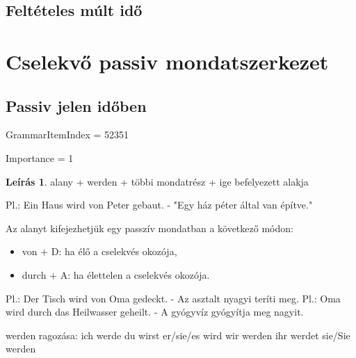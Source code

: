 \documentclass{article}
\theoremstyle{definition}
\newtheorem*{desc}{Leírás}
\begin{document}
\subsection{Feltételes múlt idő}

\section{Cselekvő passiv mondatszerkezet}

\subsection{Passiv jelen időben}

GrammarItemIndex = 52351

Importance = 1

\begin{desc}
alany + werden + többi mondatrész + ige befelyezett alakja

Pl.: Ein Haus wird von Peter gebaut. - "Egy ház péter által van építve."

Az alanyt kifejezhetjük egy passzív mondatban a következő módon:
\begin{itemize}
\item von + D: ha élő a cselekvés okozója,
\item durch + A: ha élettelen a cselekvés okozója.
\end{itemize}
Pl.: Der Tisch wird von Oma gedeckt. - Az asztalt nyagyi teríti meg.
Pl.: Oma wird durch das Heilwasser geheilt. - A gyógyvíz gyógyítja meg nagyit.

werden ragozása:
ich werde
du wirst
er/sie/es wird
wir werden
ihr werdet
sie/Sie werden
\end{desc}
\end{document}
